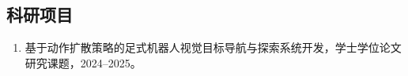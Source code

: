 ﻿%

\begin{achievements}

\subsection*{科研项目}

\begin{enumerate}
  \item 基于动作扩散策略的足式机器人视觉目标导航与探索系统开发，学士学位论文研究课题，2024--2025。
\end{enumerate}

\end{achievements}
